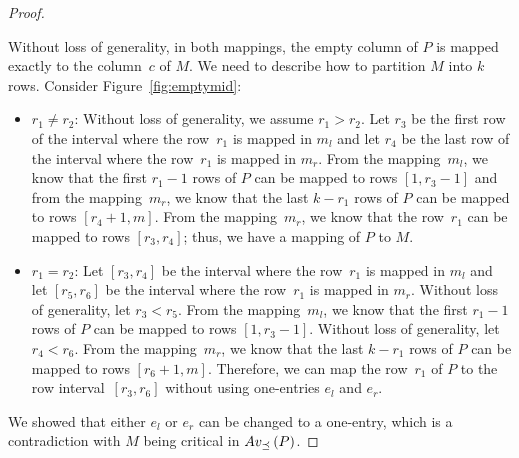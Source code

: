 \begin{proof}
\begin{itemize}
	Without loss of generality, in both mappings, the empty column of $P$ is mapped exactly to the column~$c$ of $M$. We need to describe how to partition $M$ into $k$ rows. Consider Figure~\ref{fig:emptymid}:
	\begin{itemize}
		\item $r_1\neq r_2$: Without loss of generality, we assume $r_1>r_2$. Let $r_3$ be the first row of the interval where the row~$r_1$ is mapped in $m_l$ and let $r_4$ be the last row of the interval where the row~$r_1$ is mapped in $m_r$. From the mapping~$m_l$, we know that the first $r_1-1$ rows of $P$ can be mapped to rows $[1,r_3-1]$ and from the mapping~$m_r$, we know that the last $k-r_1$ rows of $P$ can be mapped to rows $[r_4+1,m]$. From the mapping~$m_r$, we know that the row~$r_1$ can be mapped to rows $[r_3,r_4]$; thus, we have a mapping of $P$ to $M$.
		\item $r_1=r_2$: Let $[r_3,r_4]$ be the interval where the row~$r_1$ is mapped in $m_l$ and let $[r_5,r_6]$ be the interval where the row~$r_1$ is mapped in $m_r$. Without loss of generality, let $r_3<r_5$. From the mapping~$m_l$, we know that the first $r_1-1$ rows of $P$ can be mapped to rows $[1,r_3-1]$. Without loss of generality, let $r_4<r_6$. From the mapping~$m_r$, we know that the last $k-r_1$ rows of $P$ can be mapped to rows $[r_6+1,m]$. Therefore, we can map the row~$r_1$ of $P$ to the row interval~$[r_3,r_6]$ without using one-entries $e_l$ and $e_r$.
	\end{itemize}
\end{itemize}
We showed that either $e_l$ or $e_r$ can be changed to a one-entry, which is a contradiction with $M$ being critical in $Av_{\preceq}\left(P\right)$.
\end{proof}

